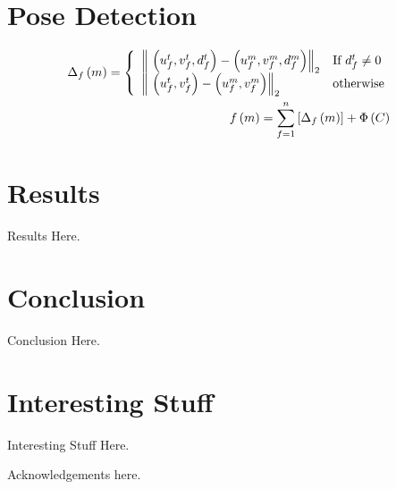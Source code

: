 \documentclass{acmtog}
\begin{document}
\section{Pose Detection}
\label{sec:realtimeposedetection}

\begin{eqnarray}
\textstyle
\Delta_{f}\left(m\right) = \left\{
    \begin{array}{l l}
      \left\|\ \left(u_f^t, v_f^t, d_f^t\right) - \left(u_f^m, v_f^m, d_f^m\right) \right\|_2 & \text{If $d_f^t \neq 0$} \\
      \left\|\ \left(u_f^t, v_f^t\right) - \left(u_f^m, v_f^m\right) \right\|_2 & \text{otherwise}
    \end{array} \right.\ \\
f\left(m\right) = \sum\limits_{f=1}^n\left[ \Delta_{f}\left(m\right) \right] + \Phi\left(C\right) \text{   }
\end{eqnarray}

\section{Results}
\label{sec:results}

Results Here.

\section{Conclusion}
\label{sec:conclusion}

Conclusion Here.

\appendix

\section{Interesting Stuff}

Interesting Stuff Here.

\begin{acks}

Acknowledgements here.

\end{acks}




\end{document}
